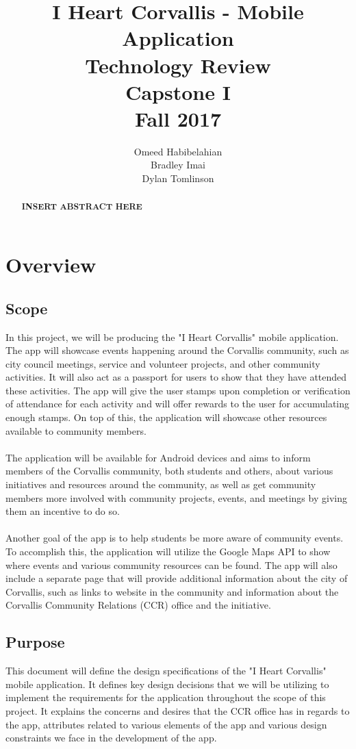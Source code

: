 \documentclass[draftclsnofoot, onecolumn, 10pt, compsoc]{IEEEtran}
\title{\textbf{I Heart Corvallis - Mobile Application\\Technology Review}\\Capstone I\\Fall 2017}
\author{Omeed Habibelahian \\ Bradley Imai \\ Dylan Tomlinson}
\begin{document}
	\maketitle
	\begin{abstract}
		\textbf{INSERT ABSTRACT HERE}
	\end{abstract}
	\newpage
	
	\tableofcontents
	\newpage
	
	\section{Overview}
		\subsection{Scope}
			In this project, we will be producing the "I Heart Corvallis" mobile application. The app will showcase events happening around the Corvallis community, such as city council meetings, service and volunteer projects, and other community activities. It will also act as a passport for users to show that they have attended these activities. The app will give the user stamps upon completion or verification of attendance for each activity and will offer rewards to the user for accumulating enough stamps. On top of this, the application will showcase other resources available to community members. \\ \\
			The application will be available for Android devices and aims to inform members of the Corvallis community, both students and others, about various initiatives and resources around the community, as well as get community members more involved with community projects, events, and meetings by giving them an incentive to do so. \\ \\
			Another goal of the app is to help students be more aware of community events. To accomplish this, the application will utilize the Google Maps API to show where events and various community resources can be found. The app will also include a separate page that will provide additional information about the city of Corvallis, such as links to website in the community and information about the Corvallis Community Relations (CCR) office and the initiative.
		\subsection{Purpose}
			This document will define the design specifications of the "I Heart Corvallis" mobile application. It defines key design decisions that we will be utilizing to implement the requirements for the application throughout the scope of this project. It explains the concerns and desires that the CCR office has in regards to the app, attributes related to various elements of the app and various design constraints we face in the development of the app.
\end{document}
